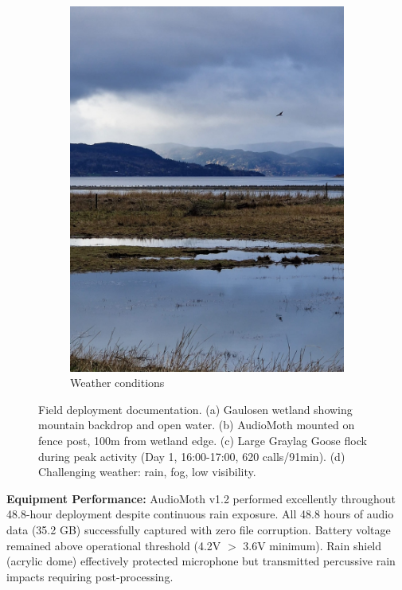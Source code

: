 \documentclass[twocolumn]{article}
\begin{document}
\begin{figure}[H]
\begin{subfigure}{0.48\columnwidth}
\includegraphics[width=\textwidth]{07_wetland_waterfowl_dramatic.jpg}
\caption{Weather conditions}
\end{subfigure}
\caption{Field deployment documentation. (a) Gaulosen wetland showing mountain backdrop and open water. (b) AudioMoth mounted on fence post, 100m from wetland edge. (c) Large Graylag Goose flock during peak activity (Day 1, 16:00-17:00, 620 calls/91min). (d) Challenging weather: rain, fog, low visibility.}
\label{fig:field_photos_inline}
\end{figure}

\textbf{Equipment Performance:} AudioMoth v1.2 performed excellently throughout 48.8-hour deployment despite continuous rain exposure. All 48.8 hours of audio data (35.2 GB) successfully captured with zero file corruption. Battery voltage remained above operational threshold (4.2V $>$ 3.6V minimum). Rain shield (acrylic dome) effectively protected microphone but transmitted percussive rain impacts requiring post-processing.
\end{document}
